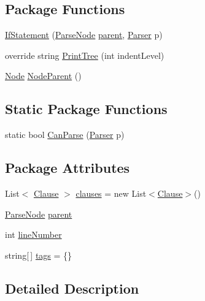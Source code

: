 \subsection*{Package Functions}
\begin{DoxyCompactItemize}
\item 
\hyperlink{a00092_ae534078389e8663edf7660403acf3cbc}{If\-Statement} (\hyperlink{a00120}{Parse\-Node} \hyperlink{a00120_af313a82103fcc2ff5a177dbb06b92f7b}{parent}, \hyperlink{a00121}{Parser} p)
\item 
override string \hyperlink{a00092_a5494c1daef8e0f3ac3ab68f91db4f332}{Print\-Tree} (int indent\-Level)
\item 
\hyperlink{a00110}{Node} \hyperlink{a00120_a580e520a29444fc23ac3660cbe514a09}{Node\-Parent} ()
\end{DoxyCompactItemize}
\subsection*{Static Package Functions}
\begin{DoxyCompactItemize}
\item 
static bool \hyperlink{a00092_afd6b96e1a27872701c4e6832f17fc3ce}{Can\-Parse} (\hyperlink{a00121}{Parser} p)
\end{DoxyCompactItemize}
\subsection*{Package Attributes}
\begin{DoxyCompactItemize}
\item 
List$<$ \hyperlink{a00028}{Clause} $>$ \hyperlink{a00092_a679b1a21582c78ed06df36bccc9c3cbc}{clauses} = new List$<$\hyperlink{a00028}{Clause}$>$()
\item 
\hyperlink{a00120}{Parse\-Node} \hyperlink{a00120_af313a82103fcc2ff5a177dbb06b92f7b}{parent}
\item 
int \hyperlink{a00120_a18b493382de0fde5b4299c1bd2250075}{line\-Number}
\item 
string\mbox{[}$\,$\mbox{]} \hyperlink{a00120_a58b3a15788fd2d4127d73619dc6d04ae}{tags} = \{\}
\end{DoxyCompactItemize}


\subsection{Detailed Description}


